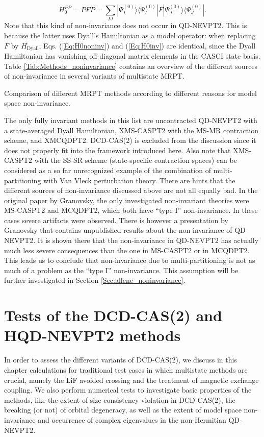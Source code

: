 	\begin{equation}
	\label{Eq:H0inv}
	H_0^{PP} = PFP = \sum\limits_{IJ} | \Psi _I^{(0)}\rangle \langle \Psi _I^{(0)}|F|\Psi _J^{(0)}\rangle \langle \Psi _J^{(0)}|.
	\end{equation}
Note that this kind of non-invariance does not occur in QD-NEVPT2. This is because the latter uses Dyall’s Hamiltonian as a model operator: when replacing $F$ by $H_\text{Dyall}$, Eqs. (\ref{Eq:H0noninv}) and (\ref{Eq:H0inv}) are identical, since the Dyall Hamiltonian has vanishing off-diagonal matrix elements in the CASCI state basis. Table \ref{Tab:Methods_noninvariance} contains an overview of the different sources of non-invariance in several variants of multistate MRPT.
\begin{table}
\small
\ttabbox
{\caption{Comparison of different MRPT methods according to different reasons for model space non-invariance.}
\label{Tab:Methods_noninvariance}}
{}
\end{table}
The only fully invariant methods in this list are uncontracted QD-NEVPT2 with a state-averaged Dyall Hamiltonian, XMS-CASPT2 with the MS-MR contraction scheme, and XMCQDPT2. DCD-CAS(2) is excluded from the discussion since it does not properly fit into the framework introduced here. Also note that XMS-CASPT2 with the SS-SR scheme (state-specific contraction spaces) can be considered as a so far unrecognized example of the combination of multi-partitioning with Van Vleck perturbation theory.
There are hints that the different sources of non-invariance discussed above are not all equally bad. In the original paper by Granovsky, the only investigated non-invariant theories were MS-CASPT2 and MCQDPT2, which both have “type I” non-invariance. In these cases severe artifacts were observed. There is however a presentation by Granovsky that contains unpublished results about the non-invariance of QD-NEVPT2.\cite{Grano_2011_} It is shown there that the non-invariance in QD-NEVPT2 has actually much less severe consequences than the one in MS-CASPT2 or in MCQDPT2. This leads us to conclude that non-invariance due to multi-partitioning is not as much of a problem as the ``type I'' non-invariance. This assumption will be further investigated in Section \ref{Sec:allene_noninvariance}.

\chapter{Tests of the DCD-CAS(2) and HQD-NEVPT2 methods}
\label{Sec:Benchmarking}
In order to assess the different variants of DCD-CAS(2), we discuss in this chapter calculations for traditional test cases in which multistate methods are crucial, namely the LiF avoided crossing and the treatment of magnetic exchange coupling.
We also perform numerical tests to investigate basic properties of the methods, like the extent of size-consistency violation in DCD-CAS(2), the  breaking (or not) of orbital degeneracy, as well as the extent of model space non-invariance and occurrence of complex eigenvalues in the non-Hermitian QD-NEVPT2. 

